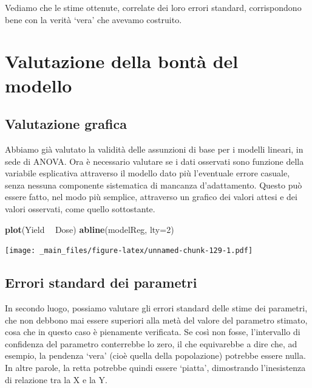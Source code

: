 \documentclass[a4paper,12pt,oneside]{book}
\newenvironment{Shaded}{\begin{snugshade}}{\end{snugshade}}
\newcommand{\KeywordTok}[1]{\textcolor[rgb]{0.13,0.29,0.53}{\textbf{#1}}}
\newcommand{\DataTypeTok}[1]{\textcolor[rgb]{0.13,0.29,0.53}{#1}}
\newcommand{\DecValTok}[1]{\textcolor[rgb]{0.00,0.00,0.81}{#1}}
\newcommand{\StringTok}[1]{\textcolor[rgb]{0.31,0.60,0.02}{#1}}
\newcommand{\OperatorTok}[1]{\textcolor[rgb]{0.81,0.36,0.00}{\textbf{#1}}}
\newcommand{\NormalTok}[1]{#1}
\theoremstyle{definition}
\theoremstyle{definition}
\theoremstyle{definition}
\theoremstyle{remark}
\begin{document}
Vediamo che le stime ottenute, correlate dei loro errori standard,
corrispondono bene con la verità `vera' che avevamo costruito.

\section{Valutazione della bontà del
modello}\label{valutazione-della-bonta-del-modello}

\subsection{Valutazione grafica}\label{valutazione-grafica}

Abbiamo già valutato la validità delle assunzioni di base per i modelli
lineari, in sede di ANOVA. Ora è necessario valutare se i dati osservati
sono funzione della variabile esplicativa attraverso il modello dato più
l'eventuale errore casuale, senza nessuna componente sistematica di
mancanza d'adattamento. Questo può essere fatto, nel modo più semplice,
attraverso un grafico dei valori attesi e dei valori osservati, come
quello sottostante.

\begin{Shaded}
\begin{Highlighting}[]
\KeywordTok{plot}\NormalTok{(Yield }\OperatorTok{~}\StringTok{ }\NormalTok{Dose)}
\KeywordTok{abline}\NormalTok{(modelReg, }\DataTypeTok{lty=}\DecValTok{2}\NormalTok{)}
\end{Highlighting}
\end{Shaded}

\texttt{[image: \_main\_files/figure-latex/unnamed-chunk-129-1.pdf]}

\subsection{Errori standard dei
parametri}\label{errori-standard-dei-parametri}

In secondo luogo, possiamo valutare gli errori standard delle stime dei
parametri, che non debbono mai essere superiori alla metà del valore del
parametro stimato, cosa che in questo caso è pienamente verificata. Se
così non fosse, l'intervallo di confidenza del parametro conterrebbe lo
zero, il che equivarebbe a dire che, ad esempio, la pendenza `vera'
(cioè quella della popolazione) potrebbe essere nulla. In altre parole,
la retta potrebbe quindi essere `piatta', dimostrando l'inesistenza di
relazione tra la X e la Y.
\end{document}
